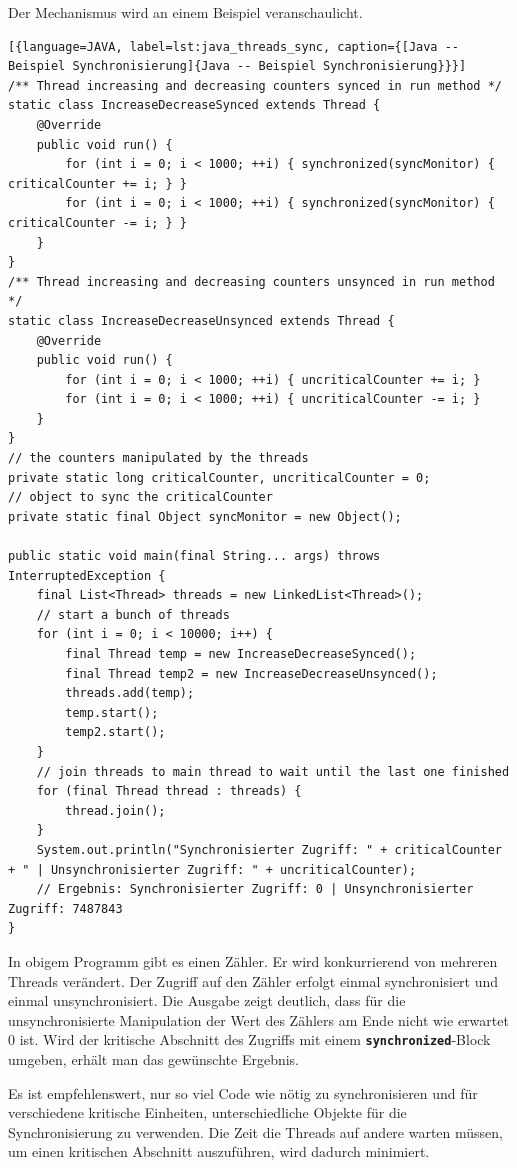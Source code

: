 \documentclass[
							a4paper, 
							11pt, 
							openany, 
							liststotoc,
							parskip=half, 
   							headings=normal
						]{scrreprt}
\begin{document}
{Der Mechanismus wird an einem Beispiel veranschaulicht.\bigskip

\begin{lstlisting}[{language=JAVA, label=lst:java_threads_sync, caption={[Java -- Beispiel Synchronisierung]{Java -- Beispiel Synchronisierung}}}]
/** Thread increasing and decreasing counters synced in run method */
static class IncreaseDecreaseSynced extends Thread {
	@Override
	public void run() {
		for (int i = 0; i < 1000; ++i) { synchronized(syncMonitor) { criticalCounter += i; } }
		for (int i = 0; i < 1000; ++i) { synchronized(syncMonitor) { criticalCounter -= i; } }
	}
}	
/** Thread increasing and decreasing counters unsynced in run method */
static class IncreaseDecreaseUnsynced extends Thread {
	@Override
	public void run() {
		for (int i = 0; i < 1000; ++i) { uncriticalCounter += i; }
		for (int i = 0; i < 1000; ++i) { uncriticalCounter -= i; }
	}
}	
// the counters manipulated by the threads
private static long criticalCounter, uncriticalCounter = 0;
// object to sync the criticalCounter
private static final Object syncMonitor = new Object();

public static void main(final String... args) throws InterruptedException {
	final List<Thread> threads = new LinkedList<Thread>();
	// start a bunch of threads
	for (int i = 0; i < 10000; i++) {
		final Thread temp = new IncreaseDecreaseSynced();
		final Thread temp2 = new IncreaseDecreaseUnsynced();
		threads.add(temp);
		temp.start();
		temp2.start();
	}
	// join threads to main thread to wait until the last one finished
	for (final Thread thread : threads) {
		thread.join();
	}
	System.out.println("Synchronisierter Zugriff: " + criticalCounter + " | Unsynchronisierter Zugriff: " + uncriticalCounter);
	// Ergebnis: Synchronisierter Zugriff: 0 | Unsynchronisierter Zugriff: 7487843
}
\end{lstlisting}

In obigem Programm gibt es einen Zähler. Er wird konkurrierend von mehreren Threads verändert. Der Zugriff auf den Zähler erfolgt einmal synchronisiert und einmal unsynchronisiert. Die Ausgabe zeigt deutlich, dass für die unsynchronisierte Manipulation der Wert des Zählers am Ende nicht wie erwartet 0 ist. Wird der kritische Abschnitt des Zugriffs mit einem \textbf{\texttt{synchronized}}-Block umgeben, erhält man das gewünschte Ergebnis.

Es ist empfehlenswert, nur so viel Code wie nötig zu synchronisieren und für verschiedene kritische Einheiten, unterschiedliche Objekte für die Synchronisierung zu verwenden. Die Zeit die Threads auf andere warten müssen, um einen kritischen Abschnitt auszuführen, wird dadurch minimiert.

}
\end{document}
